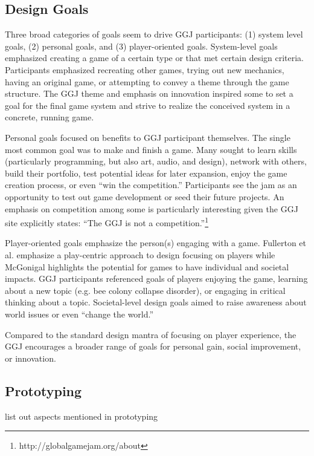 \documentclass{sig-alternate}
\begin{document}
\subsection{Design Goals}
Three broad categories of goals seem to drive GGJ participants: (1) system level goals, (2) personal goals, and (3) player-oriented goals.
System-level goals emphasized creating a game of a certain type or that met certain design criteria. Participants emphasized recreating other games, trying out new mechanics, having an original game, or attempting to convey a theme through the game structure. The GGJ theme and emphasis on innovation inspired some to set a goal for the final game system and strive to realize the conceived system in a concrete, running game.

Personal goals focused on benefits to GGJ participant themselves. 
The single most common goal  was to make and finish a game. 
Many sought to learn skills (particularly programming, but also art, audio, and design), network with others, build their portfolio, test potential ideas for later expansion, enjoy the game creation process, or even ``win the competition.'' Participants see the jam as an opportunity to test out game development or seed their future projects. An emphasis on competition among some is particularly interesting given the GGJ site explicitly states: ``The GGJ is not a competition.''\footnote{http://globalgamejam.org/about}

Player-oriented goals emphasize the person(s) engaging with a game. Fullerton et al. \cite{fullerton2008:playcentric} emphasize a play-centric approach to design focusing on players while McGonigal \cite{mcgonigal2011:realitybroken} highlights the potential for games to have individual and societal impacts.
GGJ participants referenced goals of players enjoying the game, learning about a new topic (e.g. bee colony collapse disorder), or engaging in critical thinking about a topic. Societal-level design goals aimed to raise awareness about world issues or even ``change the world.''

Compared to the standard design mantra of focusing on player experience, the GGJ encourages a broader range of goals for personal gain, social improvement, or innovation. 


\subsection{Prototyping}
list out aspects mentioned in prototyping
\end{document}
